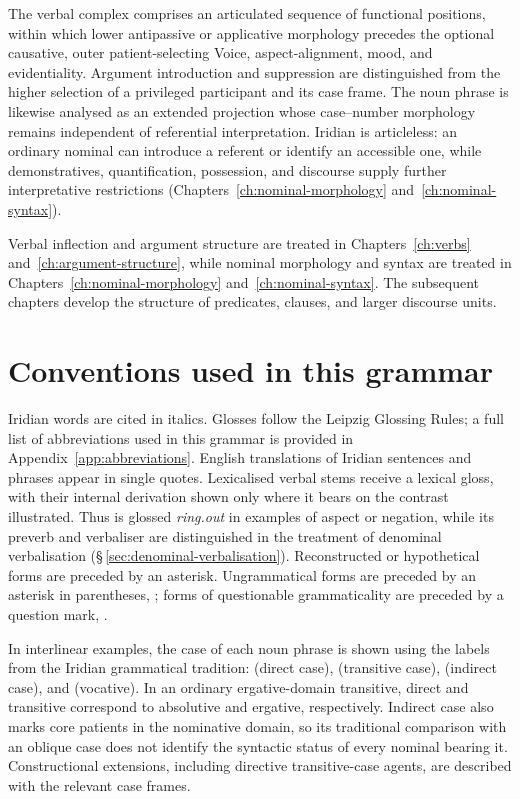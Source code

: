 The verbal complex comprises an articulated sequence of functional positions,
within which lower antipassive or applicative morphology precedes the optional
causative, outer patient-selecting Voice, aspect-alignment, mood, and
evidentiality. Argument introduction and suppression are distinguished from
the higher selection of a privileged participant and its case frame. The noun
phrase is likewise analysed as an extended projection whose case--number
morphology remains independent of referential interpretation. Iridian is
articleless: an ordinary nominal can introduce a referent or identify an
accessible one, while demonstratives, quantification, possession, and
discourse supply further interpretative restrictions
(Chapters~\ref{ch:nominal-morphology} and~\ref{ch:nominal-syntax}).

Verbal inflection and argument structure are treated in
Chapters~\ref{ch:verbs} and~\ref{ch:argument-structure}, while nominal
morphology and syntax are treated in Chapters~\ref{ch:nominal-morphology}
and~\ref{ch:nominal-syntax}. The subsequent chapters develop the structure
of predicates, clauses, and larger discourse units.

\section{Conventions used in this grammar}

Iridian words are cited in italics. Glosses follow the Leipzig Glossing Rules; a
full list of abbreviations used in this grammar is provided in Appendix~\ref{app:abbreviations}.
English translations of Iridian sentences and phrases appear in single quotes.
Lexicalised verbal stems receive a lexical gloss, with their internal
derivation shown only where it bears on the contrast illustrated. Thus
 is glossed \textit{ring.out} in examples of aspect or
negation, while its preverb and verbaliser are distinguished in the treatment
of denominal verbalisation (§\,\ref{sec:denominal-verbalisation}).
Reconstructed or hypothetical forms are preceded by an asterisk. Ungrammatical
forms are preceded by an asterisk in parentheses, \ird{*}; forms of questionable
grammaticality are preceded by a question mark, .

In interlinear examples, the case of each noun phrase is shown using the labels
from the Iridian grammatical tradition: \Dir{} (direct case), \Trs{} (transitive
case), \Ind{} (indirect case), and \Voc{} (vocative). In an ordinary
ergative-domain transitive, direct and transitive correspond to absolutive
and ergative, respectively. Indirect case also marks core patients in the
nominative domain, so its traditional comparison with an oblique case does not
identify the syntactic status of every nominal bearing it. Constructional
extensions, including directive transitive-case agents, are described with the
relevant case frames.

